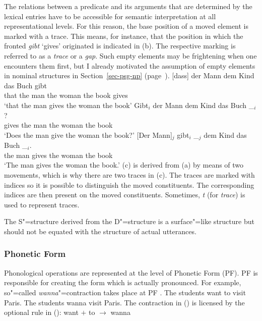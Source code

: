 The relations between a predicate and its arguments that are determined by the lexical entries have to be accessible for semantic interpretation at all 
representational levels. For this reason, the base position of a moved element is marked with a
trace. This means, for instance, that the position in which the
fronted \emph{gibt} `gives' originated is indicated in (b). The respective marking is
referred to as a \emph{trace} or a \emph{gap}. Such empty elements may be
frightening when one encounters them first, but I already motivated the assumption
of empty elements in nominal structures in Section~\ref{sec-psg-np}  (page~\pageref{np-epsilon}). 
\eal
\ex 
\gll {}[dass] der Mann dem Kind das Buch gibt\\
	 {}\spacebr{}that the man the woman the book gives\\
\glt `that the man gives the woman the book'
\ex 
\gll Gibt$_i$ der Mann dem Kind das Buch \_$_i$?\\
	 gives the man the woman the book\\
\glt `Does the man give the woman the book?'
\ex 
\gll {}[Der Mann]$_j$ gibt$_i$ \_$_j$ dem Kind das Buch \_$_i$.\\
	 {}\spacebr{}the man gives {} the woman the book\\
\glt `The man gives the woman the book.'
\zl
(c) is derived from (a) by means of two movements, which is why there are two traces in (c). The traces are marked with
indices so it is possible to distinguish the moved constituents. The corresponding indices are then present on the moved constituents. Sometimes, \emph{t} (for \emph{trace}) is used to represent traces.

The S"=structure derived from the D"=structure is a surface"=like structure but should not be equated with the structure of actual utterances.

\subsubsection{Phonetic Form}

\largerpage
Phonological operations are represented at the level of Phonetic Form (PF). PF is responsible for creating the form which
is actually pronounced. For example, so"=called \emph{wanna}"=contraction takes place at PF \citep[--21]{Chomsky81a}.
\eal
\ex The students want to visit Paris.
\ex The students wanna visit Paris.
\zl
The contraction in () is licensed by the optional rule in ():
\ea
want $+$ to $\to$ wanna
\z
{}

